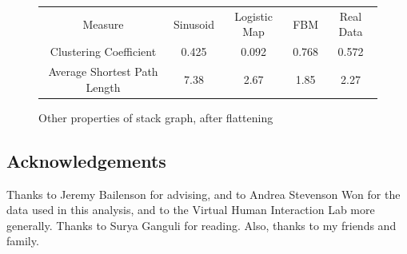 \documentclass[12pt]{article}
\begin{document}
\begin{figure}
  \centering
  \begin{tabular} {c || c c c c}
    Measure & Sinusoid & Logistic Map & FBM & Real Data \\
    Clustering Coefficient & 0.425 & 0.092 & 0.768 & 0.572 \\
    Average Shortest Path Length & 7.38 & 2.67 & 1.85 & 2.27 \\
  \end{tabular}
  \caption{Other properties of stack graph, after flattening}
  \label{fig:stack_ts_others}
\end{figure}

\subsection{Acknowledgements}

Thanks to Jeremy Bailenson for advising, and to Andrea Stevenson Won for the data used in this analysis, and to the Virtual Human Interaction Lab more generally. Thanks to Surya Ganguli for reading. Also, thanks to my friends and family.
\end{document}
